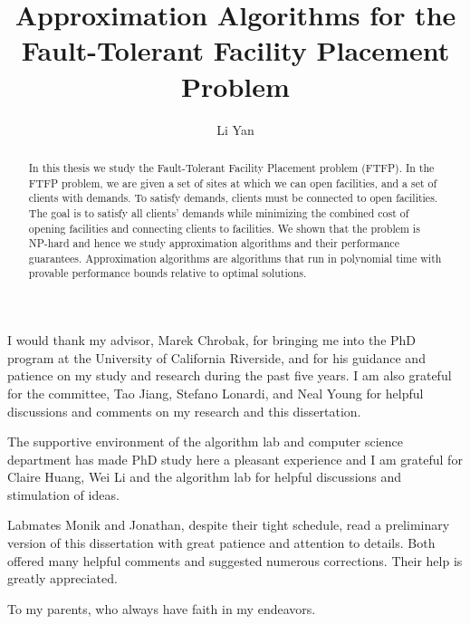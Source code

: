 \documentclass[oneside,final]{ucr}
\begin{document}

\title{Approximation Algorithms for the Fault-Tolerant Facility Placement Problem}
\author{Li Yan}

\maketitle
\copyrightpage{}
\approvalpage{}


\begin{frontmatter}

\begin{acknowledgements}
  I would thank my advisor, Marek Chrobak, for bringing me
  into the PhD program at the University of California
  Riverside, and for his guidance and patience on my study
  and research during the past five years. I am also
  grateful for the committee, Tao Jiang, Stefano Lonardi,
  and Neal Young for helpful discussions and comments on my
  research and this dissertation.

  The supportive environment of the algorithm lab and
  computer science department has made PhD study here a
  pleasant experience and I am grateful for Claire Huang,
  Wei Li and the algorithm lab for helpful discussions and
  stimulation of ideas.

  Labmates Monik and Jonathan, despite their tight schedule,
  read a preliminary version of this dissertation with great
  patience and attention to details. Both offered many
  helpful comments and suggested numerous corrections. Their
  help is greatly appreciated.
\end{acknowledgements}

\begin{dedication}
\null\vfil
{\large
\begin{center}
  To my parents, who always have faith in my endeavors.
\end{center}}
\vfil\null
\end{dedication}

\begin{abstract}
  In this thesis we study the Fault-Tolerant Facility
  Placement problem (FTFP). In the FTFP problem, we are
  given a set of sites at which we can open facilities, and
  a set of clients with demands. To satisfy demands, clients
  must be connected to open facilities. The goal is to
  satisfy all clients' demands while minimizing the combined
  cost of opening facilities and connecting clients to
  facilities. We shown that the problem is NP-hard and hence
  we study approximation algorithms and their performance
  guarantees. Approximation algorithms are algorithms that
  run in polynomial time with provable performance bounds
  relative to optimal solutions.


\end{abstract}
\end{frontmatter}
\end{document}
